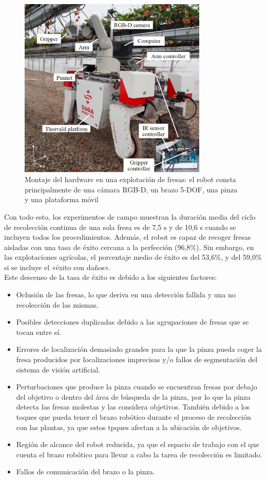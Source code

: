 \begin{figure} [H]
    \begin{center}
      \includegraphics[width=9cm]{figs/Hardware assembly in a strawberry farm.jpg}
    \end{center}
    \caption{Montaje del hardware en una explotación de fresas: el robot consta principalmente de una cámara RGB-D, un brazo 5-DOF, una pinza y una plataforma móvil}
    \label{fig:Robot_Xiong}
\end{figure}

Con todo esto, los experimentos de campo muestran la duración media del ciclo de recolección continua de una sola fresa es de 7,5 s y de 10,6 s cuando se incluyen todos los procedimientos. Además, el robot es capaz de recoger fresas aisladas con una tasa de éxito cercana a la perfección (96,8\%). Sin embargo, en las explotaciones agrícolas, el porcentaje medio de éxito es del 53,6\%, y del 59,0\% si se incluye el «éxito con daños». \\

Este descenso de la tasa de éxito es debido a los siguientes factores:

\begin{itemize}
    \item Oclusión de las fresas, lo que deriva en una detección fallida y una no recolección de las mismas.
    \item Posibles detecciones duplicadas debido a las agrupaciones de fresas que se tocan entre sí.
    \item Errores de localización demasiado grandes para la que la pinza pueda coger la fresa producidos por localizaciones imprecisas y/o fallos de segmentación del sistema de visión artificial.
    \item Perturbaciones que produce la pinza cuando se encuentran fresas por debajo del objetivo o dentro del área de búsqueda de la pinza, por lo que la pinza detecta las fresas molestas y las considera objetivos. También debido a los toques que pueda tener el brazo robótico durante el proceso de recolección con las plantas, ya que estos tpques afectan a la ubicación de objetivos.
    \item Región de alcance del robot reducida, ya que el espacio de trabajo con el que cuenta el brazo robótico para llevar a cabo la tarea de recolección es limitado.
    \item Fallos de comunicación del brazo o la pinza.
\end{itemize}

